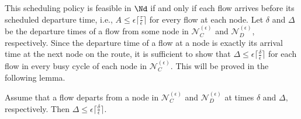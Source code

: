 \smallskip

This scheduling policy is feasible in $\Nd$ if and only if each flow
arrives before its scheduled departure time, i.e., $A\leq\epsilon\lceil\frac{\tau}{\epsilon}\rceil$
for every flow at each node. Let $\delta$ and $\Delta$ be the departure
times of a flow from some node in $\mathcal{N}_{C}^{(\epsilon)}$
and $\mathcal{N}_{D}^{(\epsilon)}$, respectively. Since the departure
time of a flow at a node is exactly its arrival time at the next node
on the route, it is sufficient to show that $\Delta\leq\epsilon\lceil\frac{\delta}{\epsilon}\rceil$
for each flow in every busy cycle of each node in $\mathcal{N}_{C}^{(\epsilon)}.$
This will be proved in the following lemma.
\begin{lem}
\label{lemma:NcNd_single_node} Assume that a flow departs from a node
in $\mathcal{N}_{C}^{(\epsilon)}$ and $\mathcal{N}_{D}^{(\epsilon)}$
at times $\delta$ and $\Delta,$ respectively. Then $\Delta\leq\epsilon\lceil\frac{\delta}{\epsilon}\rceil.$ 
\end{lem}
%
